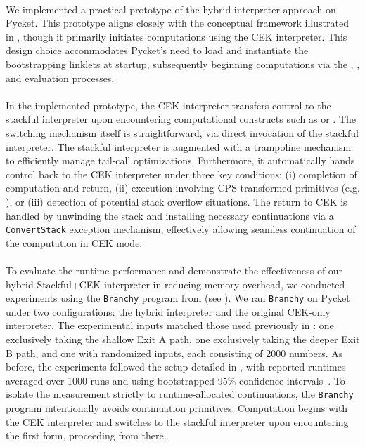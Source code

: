 
      \paragraph{}%
        We implemented a practical prototype of the hybrid interpreter approach on Pycket. This prototype aligns closely with the conceptual framework illustrated in , though it primarily initiates computations using the CEK interpreter. This design choice accommodates Pycket's need to load and instantiate the bootstrapping linklets at startup, subsequently beginning computations via the , , and evaluation processes.

      \paragraph{}%
        In the implemented prototype, the CEK interpreter transfers control to the stackful interpreter upon encountering computational constructs such as  or . The switching mechanism itself is straightforward, via direct invocation of the stackful interpreter. The stackful interpreter is augmented with a trampoline mechanism to efficiently manage tail-call optimizations. Furthermore, it automatically hands control back to the CEK interpreter under three key conditions: (i) completion of computation and return, (ii) execution involving CPS-transformed primitives (e.g. ), or (iii) detection of potential stack overflow situations. The return to CEK is handled by unwinding the stack and installing necessary continuations via a \verb|ConvertStack| exception mechanism, effectively allowing seamless continuation of the computation in CEK mode.

      \paragraph{}%
        To evaluate the runtime performance and demonstrate the effectiveness of our hybrid Stackful+CEK interpreter in reducing memory overhead, we conducted experiments using the \texttt{Branchy} program from  (see ). We ran \texttt{Branchy} on Pycket under two configurations: the hybrid interpreter and the original CEK-only interpreter. The experimental inputs matched those used previously in : one exclusively taking the shallow Exit A path, one exclusively taking the deeper Exit B path, and one with randomized inputs, each consisting of 2000 numbers. As before, the experiments followed the setup detailed in , with reported runtimes averaged over 1000 runs and using bootstrapped 95\% confidence intervals~\cite{davisonBootstrapMethods2013}. To isolate the measurement strictly to runtime-allocated continuations, the \texttt{Branchy} program intentionally avoids continuation primitives. Computation begins with the CEK interpreter and switches to the stackful interpreter upon encountering the first  form, proceeding from there.


